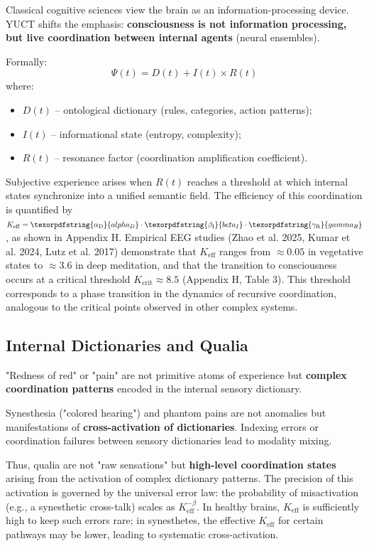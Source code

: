 \documentclass[12pt,a4paper]{article}
\DeclareRobustCommand{\alD}{\texorpdfstring{\ensuremath{\alpha_{\mathrm{D}}}}{alpha_D}}
\DeclareRobustCommand{\beI}{\texorpdfstring{\ensuremath{\beta_{\mathrm{I}}}}{beta_I}}
\DeclareRobustCommand{\gaR}{\texorpdfstring{\ensuremath{\gamma_{\mathrm{R}}}}{gamma_R}}
\newcommand{\eff}{\mathrm{eff}}
\newcommand{\Ke}{K_{\eff}}
\newcommand{\Kcrit}{K_{\mathrm{crit}}}
\begin{document}
	Classical cognitive sciences view the brain as an information-processing device. YUCT shifts the emphasis: \textbf{consciousness is not information processing, but live coordination between internal agents} (neural ensembles).
	
	Formally:
	\[
	\Psi(t) = D(t) + I(t) \times R(t)
	\]
	where:
	\begin{itemize}
		\item $D(t)$ – ontological dictionary (rules, categories, action patterns);
		\item $I(t)$ – informational state (entropy, complexity);
		\item $R(t)$ – resonance factor (coordination amplification coefficient).
	\end{itemize}
	
	Subjective experience arises when $R(t)$ reaches a threshold at which internal states synchronize into a unified semantic field. The efficiency of this coordination is quantified by $\Ke = \alD \cdot \beI \cdot \gaR$, as shown in Appendix H. Empirical EEG studies (Zhao et al. 2025, Kumar et al. 2024, Lutz et al. 2017) demonstrate that $\Ke$ ranges from $\approx 0.05$ in vegetative states to $\approx 3.6$ in deep meditation, and that the transition to consciousness occurs at a critical threshold $\Kcrit \approx 8.5$ (Appendix H, Table 3). This threshold corresponds to a phase transition in the dynamics of recursive coordination, analogous to the critical points observed in other complex systems.
	
	\subsection{Internal Dictionaries and Qualia}
	
	"Redness of red" or "pain" are not primitive atoms of experience but \textbf{complex coordination patterns} encoded in the internal sensory dictionary.
	
	\begin{tcolorbox}[title=Example: Synesthesia and Phantom Pains]
		Synesthesia ("colored hearing") and phantom pains are not anomalies but manifestations of \textbf{cross-activation of dictionaries}. Indexing errors or coordination failures between sensory dictionaries lead to modality mixing.
	\end{tcolorbox}
	
	Thus, qualia are not "raw sensations" but \textbf{high-level coordination states} arising from the activation of complex dictionary patterns. The precision of this activation is governed by the universal error law: the probability of misactivation (e.g., a synesthetic cross-talk) scales as $\Ke^{-\beta}$. In healthy brains, $\Ke$ is sufficiently high to keep such errors rare; in synesthetes, the effective $\Ke$ for certain pathways may be lower, leading to systematic cross-activation.
	
\end{document}
